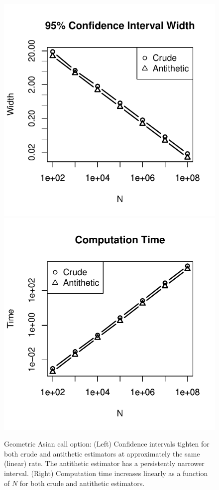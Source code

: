 \documentclass[12pt]{article}
\begin{document}
\begin{figure}[H]
	\centering
 	\includegraphics[scale=0.75]{../plots/q3/geo_asian_call_CI_widths.pdf}
	\includegraphics[scale=0.75]{../plots/q3/geo_asian_call_time.pdf}
\caption{Geometric Asian call option: (Left) Confidence intervals tighten for both crude and antithetic estimators at approximately the same (linear) rate. The antithetic estimator has a persistently narrower interval. (Right) Computation time increases linearly as a function of $N$ for both crude and antithetic estimators.}
\label{fig:geo_asian_call_CI_time}
\end{figure}
\end{document}
